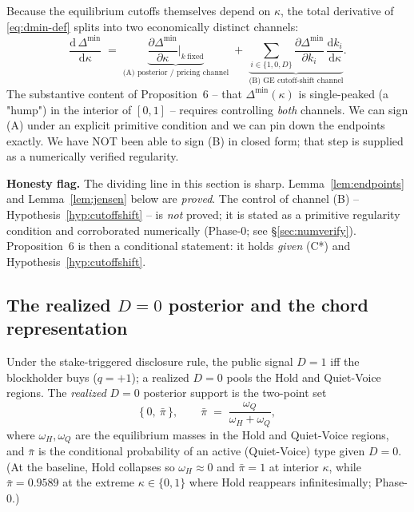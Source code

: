 Because the equilibrium cutoffs themselves depend on $\kappa$, the total
derivative of \eqref{eq:dmin-def} splits into two economically distinct
channels:
\begin{equation}
  \frac{\mathrm{d}\,\Delta^{\min}}{\mathrm{d}\kappa}
  \;=\;
  \underbrace{\frac{\partial \Delta^{\min}}{\partial \kappa}\bigg|_{k\ \text{fixed}}}_{\text{(A) posterior / pricing channel}}
  \;+\;
  \underbrace{\sum_{i\in\{1,0,D\}}\frac{\partial \Delta^{\min}}{\partial k_i}\,\frac{\mathrm{d} k_i}{\mathrm{d}\kappa}}_{\text{(B) GE cutoff-shift channel}}.
  \label{eq:decomp}
\end{equation}
The substantive content of Proposition~6 -- that $\Delta^{\min}(\kappa)$ is
single-peaked (a "hump") in the interior of $[0,1]$ -- requires controlling
\emph{both} channels. We can sign (A) under an explicit primitive condition and
we can pin down the endpoints exactly. We have NOT been able to sign (B) in
closed form; that step is supplied as a numerically verified regularity.

\medskip
\noindent\textbf{Honesty flag.} The dividing line in this section is sharp.
Lemma~\ref{lem:endpoints} and Lemma~\ref{lem:jensen} below are \emph{proved}.
The control of channel (B) -- Hypothesis~\ref{hyp:cutoffshift} -- is
\emph{not} proved; it is stated as a primitive regularity condition and
corroborated numerically (Phase-0; see \S\ref{sec:numverify}). Proposition~6 is
then a conditional statement: it holds \emph{given} (C*) and
Hypothesis~\ref{hyp:cutoffshift}.

\subsection*{The realized $D=0$ posterior and the chord representation}

Under the stake-triggered disclosure rule, the public signal $D=1$ iff the
blockholder buys ($q=+1$); a realized $D=0$ pools the Hold and Quiet-Voice
regions. The \emph{realized} $D=0$ posterior support is the two-point set
\begin{equation}
  \big\{\,0,\ \bar\pi\,\big\},
  \qquad
  \bar\pi \;=\; \frac{\omega_Q}{\omega_H+\omega_Q},
  \label{eq:twopoint}
\end{equation}
where $\omega_H,\omega_Q$ are the equilibrium masses in the Hold and
Quiet-Voice regions, and $\bar\pi$ is the conditional probability of an active
(Quiet-Voice) type given $D=0$. (At the baseline, Hold collapses so
$\omega_H\!\approx\!0$ and $\bar\pi=1$ at interior $\kappa$, while
$\bar\pi=0.9589$ at the extreme $\kappa\in\{0,1\}$ where Hold reappears
infinitesimally; Phase-0.)

